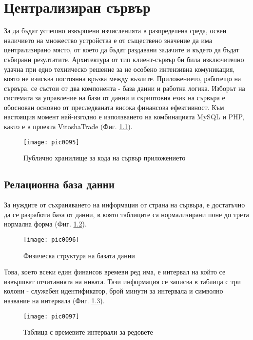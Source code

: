 \newpage
\chapter{Централизиран сървър}
\label{chapter05}

За да бъдат успешно извършени изчисленията в разпределена среда, освен наличието на множество устройства е от съществено значение да има централизирано място, от което да бъдат раздавани задачите и където да бъдат събирани резултатите. Архитектура от тип клиент-сървър би била изключително удачна при едно техническо решение за не особено интензивна комуникация, която не изисква постоянна връзка между възлите. Приложението, работещо на сървъра, се състои от два компонента - база данни и работна логика. Изборът на системата за управление на бази от данни и скриптовия език на сървъра е обоснован основно от  преследваната висока финансова ефективност. Към настоящия момент най-изгодно е използването на комбинацията MySQL и PHP, както е в проекта VitoshaTrade\cite{vtrade} (Фиг. \ref{fig:pic0095}).

\begin{figure}[h]
  \centering
  \texttt{[image: pic0095]}
  \caption{Публично хранилище за кода на сървър приложението}
\label{fig:pic0095}
\end{figure}
\FloatBarrier

\section{Релационна база данни}

За нуждите от съхраняването на информация от страна на сървъра, е достатъчно да се разработи база от данни, в която таблиците са нормализирани поне до трета нормална форма (Фиг. \ref{fig:pic0096}).

\begin{figure}[h]
  \centering
  \texttt{[image: pic0096]}
  \caption{Физическа структура на базата данни}
\label{fig:pic0096}
\end{figure}
\FloatBarrier

Това, което всеки един финансов времеви ред има, е интервал на който се извършват отчитанията на нивата. Тази информация се записва в таблица с три колони - служебен идентификатор, брой минути за интервала и символно название на интервала (Фиг. \ref{fig:pic0097}).

\begin{figure}[h]
  \centering
  \texttt{[image: pic0097]}
  \caption{Таблица с времевите интервали за редовете}
\label{fig:pic0097}
\end{figure}
\FloatBarrier

